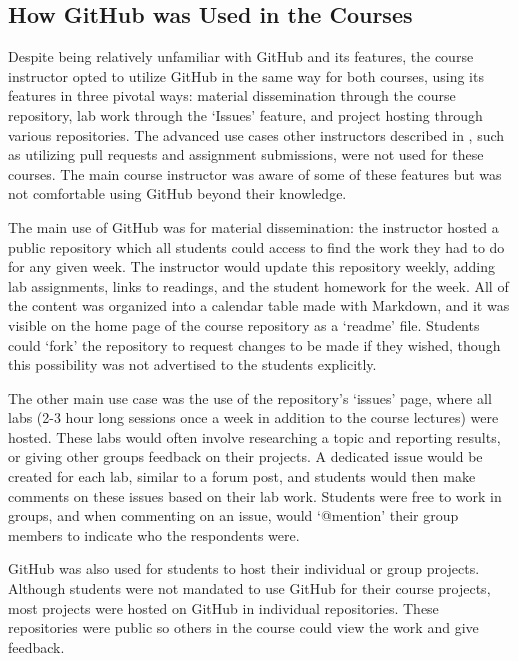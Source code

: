
\subsection{How GitHub was Used in the Courses}
Despite being relatively unfamiliar with GitHub and its features, the course instructor opted to utilize GitHub in the same way for both courses, using its features in three pivotal ways: material dissemination through the course repository, lab work through the `Issues' feature, and project hosting through various repositories. The advanced use cases other instructors described in \cite{zagalsky2015emergence}, such as utilizing pull requests and assignment submissions, were not used for these courses. The main course instructor was aware of some of these features but was not comfortable using GitHub beyond their knowledge.

The main use of GitHub was for material dissemination: the instructor hosted a public repository which all students could access to find the work they had to do for any given week. The instructor would update this repository weekly, adding lab assignments, links to readings, and the student homework for the week. All of the content was organized into a calendar table made with Markdown, and it was visible on the home page of the course repository as a `readme' file. Students could `fork' the repository to request changes to be made if they wished, though this possibility was not advertised to the students explicitly.

The other main use case was the use of the repository's `issues' page, where all labs (2-3 hour long sessions once a week in addition to the course lectures) were hosted. These labs would often involve researching a topic and reporting results, or giving other groups feedback on their projects. A dedicated issue would be created for each lab, similar to a forum post, and students would then make comments on these issues based on their lab work. Students were free to work in groups, and when commenting on an issue, would `@mention' their group members to indicate who the respondents were.

GitHub was also used for students to host their individual or group projects. Although students were not mandated to use GitHub for their course projects, most projects were hosted on GitHub in individual repositories. These repositories were public so others in the course could view the work and give feedback.

